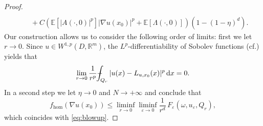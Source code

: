 \documentclass[11pt]{article}
\newcommand{\cf}{cf.\xspace}
\numberwithin{equation}{section}
\theoremstyle{definition}
\def\Xint#1{\mathchoice
{\XXint\displaystyle\textstyle{#1}}%
{\XXint\textstyle\scriptstyle{#1}}%
{\XXint\scriptstyle\scriptscriptstyle{#1}}%
{\XXint\scriptscriptstyle\scriptscriptstyle{#1}}%
\!\int}
\def\XXint#1#2#3{{\setbox0=\hbox{$#1{#2#3}{\int}$ }
\vcenter{\hbox{$#2#3$ }}\kern-.57\wd0}}
\def\dashint{\Xint-}
\let\e\varepsilon
\let\w\omega
\newcommand{\dx}{\,\mathrm{d}x}
\newcommand{\R}{\mathbb{R}}
\begin{document}
\begin{proof}
\begin{align*}
\\
&\quad+C\left(\mathbb{E}[|A(\cdot,0)|^p]|\nabla u(x_0)|^p+\mathbb{E}[\Lambda(\cdot,0)]\right)(1-(1-\eta)^d).
\end{align*}
Our construction allows us to consider the following order of limits: first we let $r\to 0$. Since $u\in W^{1,p}(D,\R^m)$, the $L^p$-differentiability of Sobolev functions (\cf \cite[Th.\,2, p.\,230]{EvGa}) yields that
\begin{equation*}
\lim_{r\to 0}\frac{1}{r^p}\dashint_{Q_r}|u(x)-L_{u,x_0}(x)|^p\dx=0.
\end{equation*}
In a second step we let $\eta\to 0$ and $N\to +\infty$ and conclude that
\begin{equation*}
f_{\hom}(\nabla u(x_0))\leq \liminf_{r\to 0}\liminf_{\e\to 0}\frac{1}{r^d}\,F_{\e}(\w,u_{\e},Q_r),
\end{equation*}
which coincides with \eqref{eq:blowup}.


\end{proof}
\end{document}

